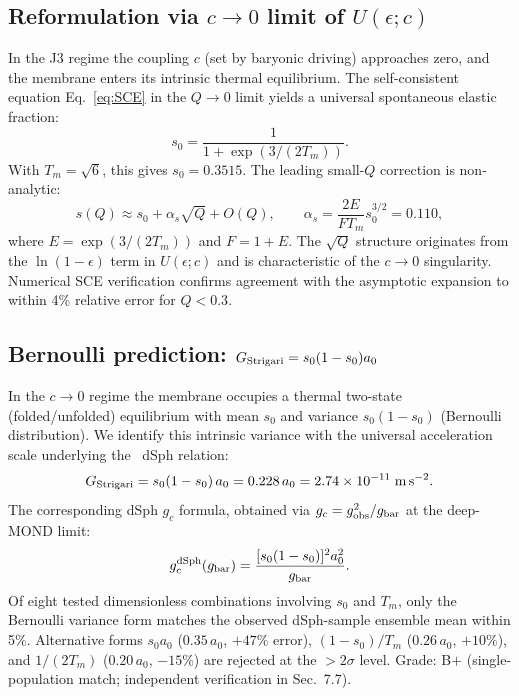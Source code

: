 \documentclass[11pt,a4paper]{article}
\newcommand{\e}[1]{\times 10^{#1}}
\newcommand{\gobs}{g_{\rm obs}}
\newcommand{\gbar}{g_{\rm bar}}
\newcommand{\gc}{g_{c}}
\newcommand{\ao}{a_{0}}
\newcommand{\Tm}{T_{m}}
\newcommand{\so}{s_{0}}
\newcommand{\Gstr}{G_{\rm Strigari}}
\begin{document}
\subsection{Reformulation via $c \to 0$ limit of $U(\epsilon; c)$}
In the J3 regime the coupling $c$ (set by baryonic driving) approaches zero, and the membrane enters its
intrinsic thermal equilibrium. The self-consistent equation Eq.~\eqref{eq:SCE} in the $Q \to 0$ limit yields
a universal spontaneous elastic fraction:
\begin{equation}
\so = \frac{1}{1 + \exp(3/(2\Tm))}.
\label{eq:s0}
\end{equation}
With $\Tm = \sqrt{6}$, this gives $\so = 0.3515$. The leading small-$Q$ correction is non-analytic:
\begin{equation}
s(Q) \approx \so + \alpha_s \sqrt{Q} + O(Q), \qquad \alpha_s = \frac{2E}{F\Tm}\so^{3/2} = 0.110,
\label{eq:sQ}
\end{equation}
where $E = \exp(3/(2\Tm))$ and $F = 1 + E$. The $\sqrt{Q}$ structure originates from the $\ln(1 - \epsilon)$
term in $U(\epsilon; c)$ and is characteristic of the $c \to 0$ singularity. Numerical SCE verification
confirms agreement with the asymptotic expansion to within 4\% relative error for $Q < 0.3$.

\subsection{Bernoulli prediction: $\Gstr = \so(1 - \so)\ao$}
In the $c \to 0$ regime the membrane occupies a thermal two-state (folded/unfolded) equilibrium with mean
$\so$ and variance $\so(1 - \so)$ (Bernoulli distribution). We identify this intrinsic variance with the
universal acceleration scale underlying the~\citet{Strigari2008} dSph relation:
\begin{equation}
\Gstr = \so(1 - \so)\,\ao = 0.228\,\ao = 2.74\e{-11}\;{\rm m\,s^{-2}}.
\label{eq:GStrigari}
\end{equation}
The corresponding dSph $\gc$ formula, obtained via $\gc = \gobs^2/\gbar$ at the deep-MOND limit:
\begin{equation}
\gc^{\rm dSph}(\gbar) = \frac{[\so(1 - \so)]^2 \ao^2}{\gbar}.
\label{eq:gcdSph}
\end{equation}
Of eight tested dimensionless combinations involving $\so$ and $\Tm$, only the Bernoulli variance form
matches the observed dSph-sample ensemble mean within 5\%. Alternative forms $\so\ao$ ($0.35\,\ao$,
$+47\%$ error), $(1 - \so)/\Tm$ ($0.26\,\ao$, $+10\%$), and $1/(2\Tm)$ ($0.20\,\ao$, $-15\%$) are rejected at
the $> 2\sigma$ level. Grade: B$+$ (single-population match; independent verification in Sec.~7.7).
\end{document}
